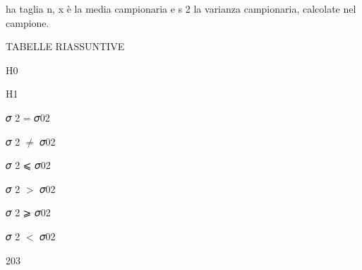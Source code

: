 \documentclass[a4paper,portrait,12pt]{article}
\begin{document}
\begin{flushleft}
ha taglia n, x \`{e} la media campionaria e s 2 la varianza campionaria, calcolate nel campione.
\end{flushleft}





\begin{flushleft}
 TABELLE RIASSUNTIVE
\end{flushleft}





\begin{flushleft}
H0
\end{flushleft}





\begin{flushleft}
H1
\end{flushleft}





\begin{flushleft}
𝜎 2 = 𝜎02
\end{flushleft}





\begin{flushleft}
𝜎 2 $\neq$ 𝜎02
\end{flushleft}





\begin{flushleft}
𝜎 2 ⩽ 𝜎02
\end{flushleft}





\begin{flushleft}
𝜎 2 $>$ 𝜎02
\end{flushleft}





\begin{flushleft}
𝜎 2 ⩾ 𝜎02
\end{flushleft}





\begin{flushleft}
𝜎 2 $<$ 𝜎02
\end{flushleft}





203
\end{document}
